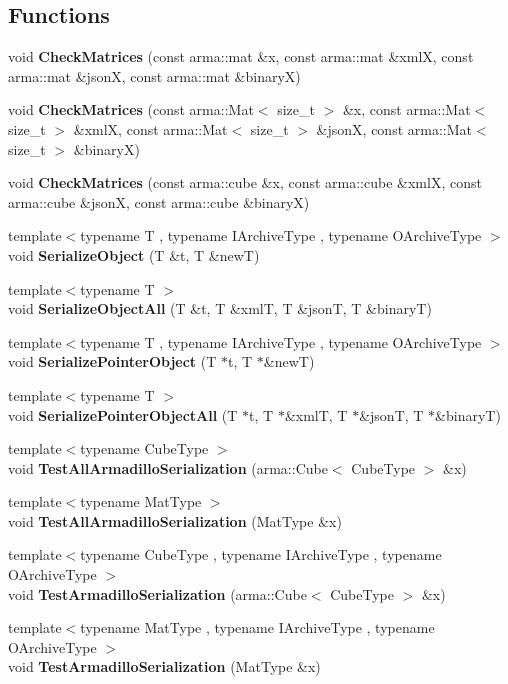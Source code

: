 \subsection*{Functions}
\begin{DoxyCompactItemize}
\item 
void \textbf{ Check\+Matrices} (const arma\+::mat \&x, const arma\+::mat \&xmlX, const arma\+::mat \&jsonX, const arma\+::mat \&binaryX)
\item 
void \textbf{ Check\+Matrices} (const arma\+::\+Mat$<$ size\+\_\+t $>$ \&x, const arma\+::\+Mat$<$ size\+\_\+t $>$ \&xmlX, const arma\+::\+Mat$<$ size\+\_\+t $>$ \&jsonX, const arma\+::\+Mat$<$ size\+\_\+t $>$ \&binaryX)
\item 
void \textbf{ Check\+Matrices} (const arma\+::cube \&x, const arma\+::cube \&xmlX, const arma\+::cube \&jsonX, const arma\+::cube \&binaryX)
\item 
{\footnotesize template$<$typename T , typename I\+Archive\+Type , typename O\+Archive\+Type $>$ }\\void \textbf{ Serialize\+Object} (T \&t, T \&newT)
\item 
{\footnotesize template$<$typename T $>$ }\\void \textbf{ Serialize\+Object\+All} (T \&t, T \&xmlT, T \&jsonT, T \&binaryT)
\item 
{\footnotesize template$<$typename T , typename I\+Archive\+Type , typename O\+Archive\+Type $>$ }\\void \textbf{ Serialize\+Pointer\+Object} (T $\ast$t, T $\ast$\&newT)
\item 
{\footnotesize template$<$typename T $>$ }\\void \textbf{ Serialize\+Pointer\+Object\+All} (T $\ast$t, T $\ast$\&xmlT, T $\ast$\&jsonT, T $\ast$\&binaryT)
\item 
{\footnotesize template$<$typename Cube\+Type $>$ }\\void \textbf{ Test\+All\+Armadillo\+Serialization} (arma\+::\+Cube$<$ Cube\+Type $>$ \&x)
\item 
{\footnotesize template$<$typename Mat\+Type $>$ }\\void \textbf{ Test\+All\+Armadillo\+Serialization} (Mat\+Type \&x)
\item 
{\footnotesize template$<$typename Cube\+Type , typename I\+Archive\+Type , typename O\+Archive\+Type $>$ }\\void \textbf{ Test\+Armadillo\+Serialization} (arma\+::\+Cube$<$ Cube\+Type $>$ \&x)
\item 
{\footnotesize template$<$typename Mat\+Type , typename I\+Archive\+Type , typename O\+Archive\+Type $>$ }\\void \textbf{ Test\+Armadillo\+Serialization} (Mat\+Type \&x)
\end{DoxyCompactItemize}


